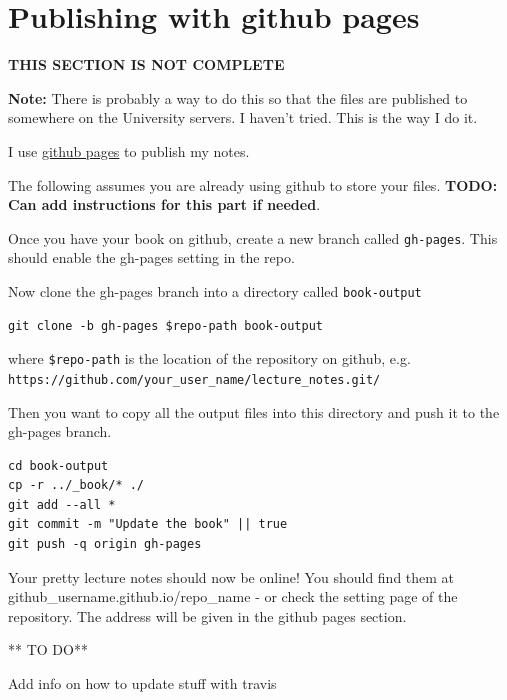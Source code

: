 \documentclass[]{book}
\begin{document}
\hypertarget{sec:gh-pages}{%
\section{Publishing with github pages}\label{sec:gh-pages}}

\textbf{THIS SECTION IS NOT COMPLETE}

\textbf{Note:} There is probably a way to do this so that the files are published to somewhere on the University servers. I haven't tried. This is the way I do it.

I use \href{pages.github.com}{github pages} to publish my notes.

The following assumes you are already using github to store your files. \textbf{TODO: Can add instructions for this part if needed}.

Once you have your book on github, create a new branch called \texttt{gh-pages}. This should enable the gh-pages setting in the repo.

Now clone the gh-pages branch into a directory called \texttt{book-output}

\begin{verbatim}
git clone -b gh-pages $repo-path book-output
\end{verbatim}

where \texttt{\$repo-path} is the location of the repository on github, e.g. \texttt{https://github.com/your\_user\_name/lecture\_notes.git/}

Then you want to copy all the output files into this directory and push it to the gh-pages branch.

\begin{verbatim}
cd book-output
cp -r ../_book/* ./
git add --all *
git commit -m "Update the book" || true
git push -q origin gh-pages
\end{verbatim}

Your pretty lecture notes should now be online! You should find them at github\_username.github.io/repo\_name - or check the setting page of the repository. The address will be given in the github pages section.

** TO DO**

Add info on how to update stuff with travis


\end{document}
